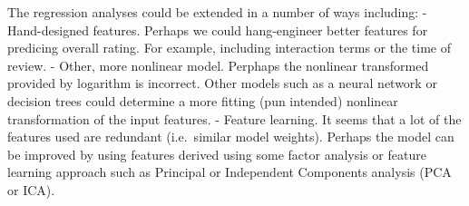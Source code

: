 \documentclass{article}
\begin{document}
The regression analyses could be extended in a number of ways including:
- Hand-designed features. Perhaps we could hang-engineer better features
for predicing overall rating. For example, including interaction terms
or the time of review. - Other, more nonlinear model. Perphaps the
nonlinear transformed provided by logarithm is incorrect. Other models
such as a neural network or decision trees could determine a more
fitting (pun intended) nonlinear transformation of the input features. -
Feature learning. It seems that a lot of the features used are redundant
(i.e.~similar model weights). Perhaps the model can be improved by using
features derived using some factor analysis or feature learning approach
such as Principal or Independent Components analysis (PCA or ICA).


    
    
    
    
\end{document}
